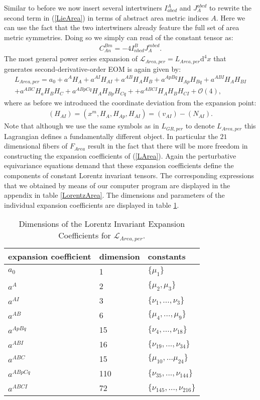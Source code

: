 Similar to before we now insert several intertwiners $I^A_{abcd}$ and $J_A^{abcd}$ to rewrite the second term in (\ref{LieArea}) in terms of abstract area metric indices $A$. Here we can use the fact that the two intertwiners already feature the full set of area metric symmetries.  Doing so we simply can read of the constant tensor as:
\begin{align}\label{areaGotayMInter}
    C_{An}^{Bm} = -4 I^B_{nbcd} J_A^{mbcd}.
\end{align}
The most general power series expansion of $\mathcal{L}_{Area,per} = L_{Area,per}\mathrm{d}^4x$ that generates second-derivative-order EOM is again given by:
\begin{align}\label{LArea}
    L_{Area,per} =  a_0 + a^A H_A + a^{AI}H_{AI} + a^{AB} H_{A}H_{B} + a^{ApBq} H_{Ap}H_{Bq} + a^{ABI} H_{A} H_{BI} \\
    + a^{ABC} H_a H_B H_C + a^{ABpCq} H_{A}H_{Bp}H_{Cq} +
    + a^{ABCI} H_A H_B H_{CI} 
    + \mathcal{O}(4),
\end{align}
where as before we introduced the coordinate deviation from the expansion point: 
\begin{align}
(H_{AI}) = (x^m,H_A,H_{Ap},H_{AI}) = (v_{AI}) - (N_{AI}).
\end{align}
Note that although we use the same symbols as in $L_{GR,per}$ to denote $L_{Area,per}$ this Lagrangian defines a fundamentally different object. In particular the $21$ dimensional fibers of  $F_{Area}$ result in the fact that there will be more freedom in constructing the expansion coefficients of (\ref{LArea}). Again the perturbative equivariance equations demand that these expansion coefficients define the components of constant Lorentz invariant tensors. The corresponding expressions that we obtained by means of our computer program are displayed in the appendix in table \ref{LorentzArea}. The dimensions and parameters of the individual expansion coefficients are displayed in table \ref{AreaExp}.
\begin{table}
\centering 
\begin{tabular}{lll} \toprule
    expansion coefficient & dimension & constants   \\ \midrule
    $a_0$ & 1 & $\{\mu_1\}$ \\
    $a^A$ & 2 & $\{\mu_2,\mu_3\}$ \\
    $a^{AI}$ & 3 & $\{\nu_1,..., \nu_3\}$ \\
    $a^{AB}$ & 6 & $\{\mu_4,..., \mu_9 \} $ \\
    $a^{ApBq}$ & 15 & $\{\nu_4,...,\nu_{18}\}$ \\
    $a^{ABI}$ & 16 & $\{ \nu_{19},...,\nu_{34} \}$ \\
    $a^{ABC}$ & 15 & $\{ \mu_{10},...\mu_{24} \}$\\
    $a^{ABpCq}$ & 110 & $\{\nu_{35},...,\nu_{144} \}$ \\
    $a^{ABCI}$ & 72 & $\{ \nu_{145},...,\nu_{216}\}$ \\ \bottomrule
\end{tabular}
\caption{Dimensions of the Lorentz Invariant Expansion Coefficients for $\mathcal{L}_{Area,per}$.}\label{AreaExp}
\end{table}
